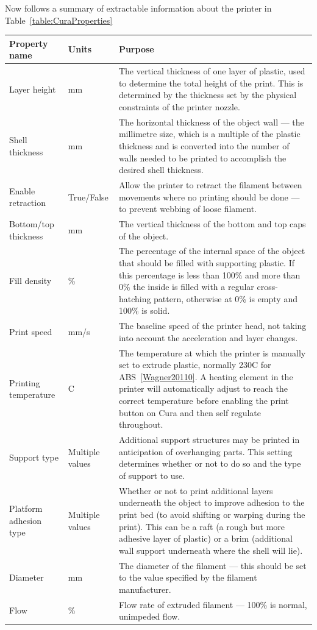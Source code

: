 \documentclass[11pt]{report} %
\begin{document}
Now follows a summary of extractable information about the printer in Table~\ref{table:CuraProperties}
\begin{table}[h]{\begin{minipage}{\textwidth}
\begin{tabular}{| p{3cm} | p{2cm} | p{8.5cm} |}
\hline

Property name & Units & Purpose\\\hline
Layer height & mm & The vertical thickness of one layer of plastic, used to determine the total height of the print. This is determined by the thickness set by the physical constraints of the printer nozzle.\\\hline
Shell thickness & mm & The horizontal thickness of the object wall --- the millimetre size, which is a multiple of the plastic thickness and is converted into the number of walls needed to be printed to accomplish the desired shell thickness.\\\hline
Enable retraction & True/False & Allow the printer to retract the filament between movements where no printing should be done --- to prevent webbing of loose filament.\\\hline
Bottom/top thickness & mm & The vertical thickness of the bottom and top caps of the object.\\\hline
Fill density & \% & The percentage of the internal space of the object that should be filled with supporting plastic. If this percentage is less than 100\% and more than 0\% the inside is filled with a regular cross-hatching pattern, otherwise at 0\% is empty and 100\% is solid.\\\hline
Print speed & mm/s & The baseline speed of the printer head, not taking into account the acceleration and layer changes.\\\hline
Printing temperature & \degree{}C & The temperature at which the printer is manually set to extrude plastic, normally 230\degree{}C for ABS~\ref{Wagner20110}. A heating element in the printer will automatically adjust to reach the correct temperature before enabling the print button on Cura and then self regulate throughout.\\\hline
Support type & Multiple values & Additional support structures may be printed in anticipation of overhanging parts. This setting determines whether or not to do so and the type of support to use.\\\hline
Platform adhesion type & Multiple values & Whether or not to print additional layers underneath the object to improve adhesion to the print bed (to avoid shifting or warping during the print). This can be a raft (a rough but more adhesive layer of plastic) or a brim (additional wall support underneath where the shell will lie).\\\hline
Diameter & mm & The diameter of the filament --- this should be set to the value specified by the filament manufacturer.\\\hline
Flow & \% & Flow rate of extruded filament --- 100\% is normal, unimpeded flow.\\\hline


\end{tabular}
\end{minipage}}
\end{table}
\end{document}
